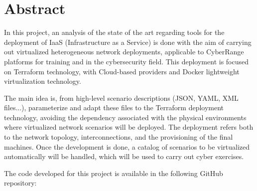 \newpage
\thispagestyle{plain}
\section*{Abstract}
  
  In this project, an analysis of the state of the art regarding tools for the deployment of IaaS (Infrastructure as a Service) is done with the aim of carrying out virtualized heterogeneous network deployments, applicable to CyberRange platforms for training and in the cybersecurity field. This deployment is focused on Terraform technology, with Cloud-based providers and Docker lightweight virtualization technology.

  The main idea is, from high-level scenario descriptions (JSON, YAML, XML files...), parameterize and adapt these files to the Terraform deployment technology, avoiding the dependency associated with the physical environments where virtualized network scenarios will be deployed. The deployment refers both to the network topology, interconnections, and the provisioning of the final machines. Once the development is done, a catalog of scenarios to be virtualized automatically will be handled, which will be used to carry out cyber exercises.

  The code developed for this project is available in the following GitHub repository:

  \vspace{0.2cm}

  \begin{tcolorbox}[colback=orange!5!white,colframe=orange!75!black]
  \centering\href{https://github.com/samugs13/daerv}{\textbf{\color{blue}{https://github.com/samugs13/daerv}}}
  \end{tcolorbox}


\afterpage{\blankpage}

